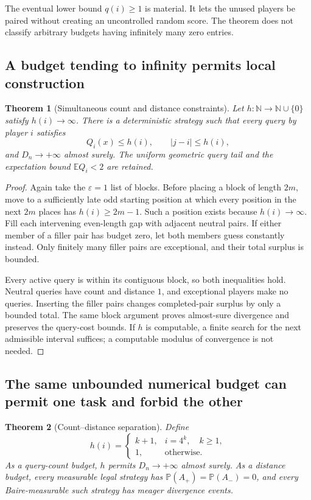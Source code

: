 \documentclass[11pt,letterpaper]{article}
\newtheorem{theorem}{Theorem}[section]
\theoremstyle{definition}
\newcommand{\N}{\mathbb N}
\newcommand{\E}{\mathbb E}
\newcommand{\Prb}{\mathbb P}
\begin{document}
The eventual lower bound \(q(i)\ge1\) is material. It lets the unused
players be paired without creating an uncontrolled random score.
The theorem does not classify arbitrary budgets having infinitely many
zero entries.

\subsection{A budget tending to infinity permits local construction}

\begin{theorem}[Simultaneous count and distance constraints]
\label{mbg:qry:thm:local}
Let \(h:\N\to\N\cup\{0\}\) satisfy \(h(i)\to\infty\).
There is a deterministic strategy such that every query by player \(i\)
satisfies
\[
 Q_i(x)\le h(i),\qquad |j-i|\le h(i),
\]
and \(D_n\to+\infty\) almost surely. The uniform geometric query tail
and the expectation bound \(\E Q_i<2\) are retained.
\end{theorem}

\begin{proof}
Again take the \(\varepsilon=1\) list of blocks. Before placing a block
of length \(2m\), move to a sufficiently late odd starting position at
which every position in the next \(2m\) places has
\(h(i)\ge2m-1\). Such a position exists because \(h(i)\to\infty\).
Fill each intervening even-length gap with adjacent neutral pairs.
If either member of a filler pair has budget zero, let both members
guess constantly instead. Only finitely many filler pairs are
exceptional, and their total surplus is bounded.

Every active query is within its contiguous block, so both inequalities
hold. Neutral queries have count and distance \(1\), and exceptional
players make no queries. Inserting the filler pairs changes
completed-pair surplus by only a bounded total. The same block argument
proves almost-sure divergence and preserves the query-cost bounds.
If \(h\) is computable, a finite search for the next admissible interval
suffices; a computable modulus of convergence is not needed.
\end{proof}

\subsection{The same unbounded numerical budget can permit one task
and forbid the other}

\begin{theorem}[Count--distance separation]
\label{mbg:qry:thm:separation}
Define
\begin{equation}
 h(i)=
 \begin{cases}
 k+1,&i=4^k,\quad k\ge1,\\
 1,&\text{otherwise}.
 \end{cases}
 \label{mbg:qry:eq:sparsebudget}
\end{equation}
As a query-count budget, \(h\) permits \(D_n\to+\infty\) almost surely.
As a distance budget, every measurable legal strategy has
\(\Prb(A_+)=\Prb(A_-)=0\), and every Baire-measurable such strategy has
meager divergence events.
\end{theorem}
\end{document}
